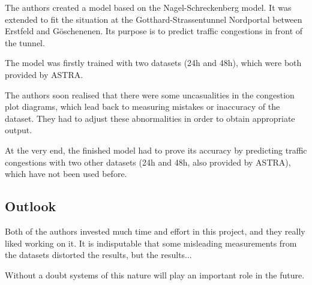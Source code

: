 The authors created a model based on the Nagel-Schreckenberg model. It was extended to fit the situation at the
Gotthard-Strassentunnel Nordportal between Erstfeld and Göschenenen. Its purpose is to predict traffic congestions in
front of the tunnel.

The model was firstly trained with two datasets (24h and 48h), which were both provided by ASTRA.

The authors soon realised that there were some uncasualities in the congestion plot diagrams, which lead back to
measuring mistakes or inaccuracy of the dataset. They had to adjust these abnormalities in order to obtain appropriate output.

At the very end, the finished model had to prove its accuracy by predicting traffic congestions with two other datasets
(24h and 48h, also provided by ASTRA), which have not been used before.


\subsection{Outlook}
Both of the authors invested much time and effort in this project, and they really liked working on it. It is indisputable
that some misleading measurements from the datasets distorted the results, but the results...

Without a doubt systems of this nature will play an important role in the future.
